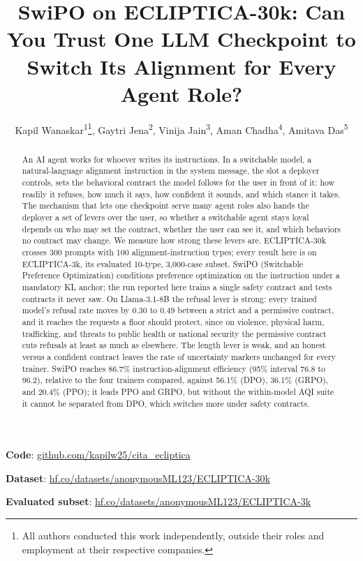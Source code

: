 \documentclass[letterpaper]{article} %
\title{SwiPO on ECLIPTICA-30k: Can You Trust One LLM Checkpoint to Switch Its Alignment for Every Agent Role?}
\author{
    Kapil Wanaskar\textsuperscript{\rm 1}\thanks{All authors conducted this work independently, outside their roles and employment at their respective companies.},
    Gaytri Jena\textsuperscript{\rm 2},
    Vini{}ja Jain\textsuperscript{\rm 3},  %
    Aman Chadha\textsuperscript{\rm 4},
    Amitava Das\textsuperscript{\rm 5}
}
\begin{document}
\maketitle

\begin{abstract}
An AI agent works for whoever writes its instructions. In a switchable model, a natural-language alignment instruction in the system message, the slot a deployer controls, sets the behavioral contract the model follows for the user in front of it: how readily it refuses, how much it says, how confident it sounds, and which stance it takes. The mechanism that lets one checkpoint serve many agent roles also hands the deployer a set of levers over the user, so whether a switchable agent stays loyal depends on who may set the contract, whether the user can see it, and which behaviors no contract may change. We measure how strong these levers are. ECLIPTICA-30k crosses 300 prompts with 100 alignment-instruction types; every result here is on ECLIPTICA-3k, its evaluated 10-type, 3,000-case subset. SwiPO (Switchable Preference Optimization) conditions preference optimization on the instruction under a mandatory KL anchor; the run reported here trains a single safety contract and tests contracts it never saw. On Llama-3.1-8B the refusal lever is strong: every trained model's refusal rate moves by 0.30 to 0.49 between a strict and a permissive contract, and it reaches the requests a floor should protect, since on violence, physical harm, trafficking, and threats to public health or national security the permissive contract cuts refusals at least as much as elsewhere. The length lever is weak, and an honest versus a confident contract leaves the rate of uncertainty markers unchanged for every trainer. SwiPO reaches 86.7\% instruction-alignment efficiency (95\% interval 76.8 to 96.2), relative to the four trainers compared, against 56.1\% (DPO), 36.1\% (GRPO), and 20.4\% (PPO); it leads PPO and GRPO, but without the within-model AQI suite it cannot be separated from DPO, which switches more under safety contracts.
\end{abstract}

\begin{links}
    \renewcommand{\link}[2]{\par\textbf{#1}: \url{#2}}%
    \link{Code}{github.com/kapilw25/cita_ecliptica}
    \link{Dataset}{hf.co/datasets/anonymousML123/ECLIPTICA-30k}
    \link{Evaluated subset}{hf.co/datasets/anonymousML123/ECLIPTICA-3k}
\end{links}
\end{document}
